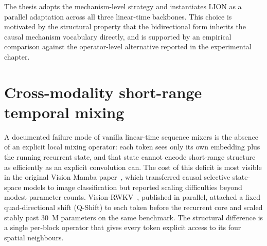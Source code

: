 The thesis adopts the mechanism-level strategy and instantiates
LION as a parallel adaptation across all three linear-time
backbones. This choice is motivated by the structural property
that the bidirectional form inherits the causal mechanism
vocabulary directly, and is supported by an empirical comparison
against the operator-level alternative reported in the
experimental chapter.

\section{Cross-modality short-range temporal mixing}\label{sec:related:cross-modality}

A documented failure mode of vanilla linear-time sequence mixers
is the absence of an explicit local mixing operator: each token
sees only its own embedding plus the running recurrent state, and
that state cannot encode short-range structure as efficiently as
an explicit convolution can. The cost of this deficit is most
visible in the original Vision Mamba
paper~\cite{zhu2024visionmamba}, which transferred causal
selective state-space models to image classification but reported
scaling difficulties beyond modest parameter counts.
Vision-RWKV~\cite{duan2024visionrwkv}, published in parallel,
attached a fixed quad-directional shift (Q-Shift) to each token
before the recurrent core and scaled stably past 30~M parameters
on the same benchmark. The structural difference is a single
per-block operator that gives every token explicit access to its
four spatial neighbours.


